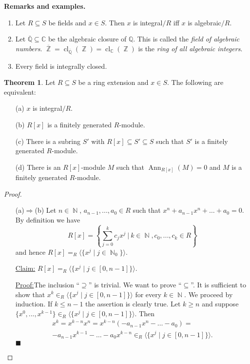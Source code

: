 \documentclass[12pt,a4paper]{report}
\theoremstyle{definition}
\newtheorem{theorem}{Theorem}[chapter] %
\theoremstyle{num.custom-title}
\newenvironment{claim}[1]{\par\noindent\underline{Claim#1:}\space}{} %
\newenvironment{claimproof}[1]{\par\noindent\underline{Proof:}\space#1}{\leavevmode\unskip\penalty9999 \hbox{}\nobreak\hfill\quad\hbox{$\blacksquare$}} %
\DeclareMathOperator{\Ann}{Ann}
\DeclareMathOperator{\N}{\mathbb{N}}
\DeclareMathOperator{\Z}{\mathbb{Z}}
\DeclareMathOperator{\imp}{\Rightarrow}
\DeclareMathOperator{\sse}{\subseteq}
\DeclareMathOperator{\cl}{cl}
\newcommand{\ol}{\overline}
\newcommand{\C}{\mathbb{C}}
\newcommand{\Q}{\mathbb{Q}}
\begin{document}
\noindent\textbf{Remarks and examples.}
\begin{enumerate}
\item Let $R \sse S$ be fields and $x \in S$. Then $x$ is integral$/R$ iff $x$ is algebraic$/R$.
\item Let $\ol{\Q} \sse \C$ be the algebraic closure of $\Q$. This is called the \emph{field of algebraic numbers}. $\ol{\Z}= \cl_{\ol{\Q}}(\Z)  = \cl_{\C}(\Z)$ is the \emph{ring of all algebraic integers}.
\item Every field is integrally closed.
\end{enumerate}

\begin{theorem}
Let $R \sse S$ be a ring extension and $x \in S$. The following are equivalent:
\begin{itemize}
\item[(a)] $x$ is integral$/R$.
\item[(b)] $R[x]$ is a finitely generated $R$-module.
\item[(c)] There is a subring $S'$ with $R[x] \sse S' \sse S$ such that $S'$ is a finitely generated $R$-module.
\item[(d)] There is an $R[x]$-module $M$ such that $\Ann_{R[x]}(M)=0$ and $M$ is a finitely generated $R$-module.
\end{itemize}
\begin{proof}\ 
\begin{itemize}
\item[(a)$\imp$(b)] Let $n \in \N$, $a_{n-1},...,a_0 \in R$ such that $x^n+a_{n-1}x^n + \ldots + a_0 = 0$. By definition we have
\[
R[x] = \left\{ \sum_{j=0}^k c_j x^j \ \Bigg| \ k \in \N, c_0,...,c_k \in R \right\}
\]
and hence $R[x] = _R \langle \{x^j \mid j \in \N_0 \} \rangle$.
\begin{claim}{} $R[x] = _R \langle \{x^j \mid j \in [0,n-1] \} \rangle$.
\begin{claimproof} The inclusion ``$\supseteq$'' is trivial. We want to prove ``$\sse$''. It is sufficient to show that $x^k \in _R \langle \{x^j \mid j \in [0,n-1] \} \rangle$ for every $k \in \N$. We proceed by induction. If $k \leq n-1$ the assertion is clearly true. Let $k \geq n$ and suppose $\{x^0,...,x^{k-1}\} \in _R \langle \{x^j \mid j \in [0,n-1] \} \rangle$. Then
\begin{multline*}
x^k = x^{k-n}x^n = x^{k-n} \left( -a_{n-1}x^n - \ldots - a_0 \right) =\\
-a_{n-1}x^{k-1} - \ldots - a_0 x^{k-n} \in _R \langle \{x^j \mid j \in [0,n-1] \} \rangle.

\end{multline*}
\end{claimproof}
\end{claim}
\end{itemize}
\end{proof}
\end{theorem}
\end{document}
